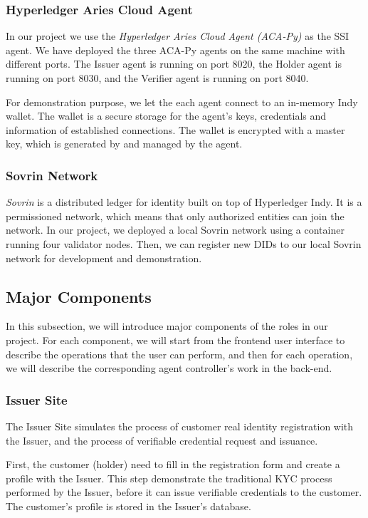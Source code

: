 \documentclass[
]{report}
\begin{document}
\subsubsection{Hyperledger Aries Cloud Agent}
In our project we use the \emph{Hyperledger Aries Cloud Agent (ACA-Py)}
as the SSI agent. We have deployed the three ACA-Py agents on the same
machine with different ports. The Issuer agent is running on port 8020,
the Holder agent is running on port 8030, and the Verifier agent is
running on port 8040.

For demonstration purpose, we let the each agent connect to an in-memory
Indy wallet. The wallet is a secure storage for the agent's keys,
credentials and information of established connections. The wallet is
encrypted with a master key, which is generated by and managed by the
agent.

\subsubsection{Sovrin Network}
\emph{Sovrin} is a distributed ledger for identity built on top of
Hyperledger Indy. It is a permissioned network, which means that only
authorized entities can join the network. In our project, we deployed a
local Sovrin network using a container running four validator nodes.
Then, we can register new DIDs to our local Sovrin network for development
and demonstration.

\subsection{Major Components}
In this subsection, we will introduce major components of the roles
in our project. For each component, we will start from the frontend user
interface to describe the operations that the user can perform, and then
for each operation, we will describe the corresponding agent controller's
work in the back-end.
\subsubsection{Issuer Site}
The Issuer Site simulates the process of customer real identity registration
with the Issuer, and the process of verifiable credential request and 
issuance. 

First, the customer (holder) need to fill in the registration form and create a
profile with the Issuer. This step demonstrate the traditional KYC process
performed by the Issuer, before it can issue verifiable credentials to the
customer. The customer's profile is stored in the Issuer's database.
\end{document}
